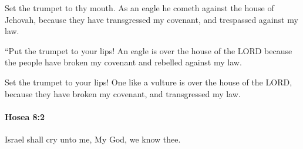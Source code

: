			\begin{versebox}
					\item[BHS] 
					\item[LXX] 
					\item[ASV] Set the trumpet to thy mouth. As an eagle he cometh against the house of Jehovah, because they have transgressed my covenant, and trespassed against my law.
					\item[NIV] “Put the trumpet to your lips! An eagle is over the house of the LORD because the people have broken my covenant and rebelled against my law.
					\item[NRSV] Set the trumpet to your lips! One like a vulture is over the house of the LORD, because they have broken my covenant, and transgressed my law.
			\end{versebox}

		\paragraph{Hosea 8:2} %
			\label{HOSEA-8-2}

			Israel shall cry unto me, My God, we know thee.

